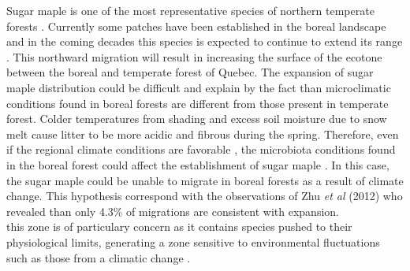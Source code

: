 Sugar maple is one of the most representative species of northern temperate forests \cite{Graignic2013,Messaoud2007,Kellman2004}. Currently some patches have been established in the boreal landscape  and in the coming decades this species is expected to continue to extend its range \cite{Graignic2013,Goldblum2005,Woodall2009}. This northward migration will result in increasing the surface of the ecotone between the boreal and temperate forest of Quebec. The expansion of sugar maple distribution could be difficult and explain by the fact than microclimatic conditions found in boreal forests are different from those present in temperate forest. Colder temperatures from shading and excess soil moisture due to snow melt cause litter to be more acidic and fibrous during the spring. Therefore, even if the regional climate conditions are favorable \cite{Kellman2004}, the microbiota conditions found in the boreal forest could affect the establishment of sugar maple \cite{Kellman2004,Moore2008,DeFrenne2013}. In this case, the sugar maple could be unable to migrate in boreal forests as a result of climate change. This hypothesis correspond with the observations of Zhu \emph{et al} (2012) who revealed than only 4.3\% of migrations are consistent with expansion\cite{Zhu2012}.\\


this zone is of particulary concern as it contains species pushed to their physiological limits, generating a zone sensitive to environmental fluctuations such as those from a climatic change \cite{Messaoud2007,Goldblum2010}. 